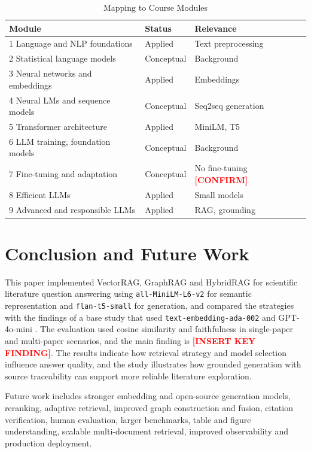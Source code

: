 \documentclass[conference]{IEEEtran}
\newcommand{\ph}[1]{\textbf{\textcolor{red}{[#1]}}}
\begin{document}
\begin{table}[t]
\caption{Mapping to Course Modules}
\label{tab:modules}
\centering
\footnotesize
\begin{tabular}{p{3.9cm}p{1.1cm}p{2.0cm}}
\toprule
Module & Status & Relevance \\
\midrule
1 Language and NLP foundations & Applied & Text preprocessing \\
2 Statistical language models & Conceptual & Background \\
3 Neural networks and embeddings & Applied & Embeddings \\
4 Neural LMs and sequence models & Conceptual & Seq2seq generation \\
5 Transformer architecture & Applied & MiniLM, T5 \\
6 LLM training, foundation models & Conceptual & Background \\
7 Fine-tuning and adaptation & Conceptual & No fine-tuning \ph{CONFIRM} \\
8 Efficient LLMs & Applied & Small models \\
9 Advanced and responsible LLMs & Applied & RAG, grounding \\
\bottomrule
\end{tabular}
\end{table}

\section{Conclusion and Future Work}
This paper implemented VectorRAG, GraphRAG and HybridRAG for scientific literature question answering using \texttt{all-MiniLM-L6-v2} for semantic representation and \texttt{flan-t5-small} for generation, and compared the strategies with the findings of a base study that used \texttt{text-embedding-ada-002} and GPT-4o-mini \cite{ghanadian2026base}. The evaluation used cosine similarity and faithfulness in single-paper and multi-paper scenarios, and the main finding is \ph{INSERT KEY FINDING}. The results indicate how retrieval strategy and model selection influence answer quality, and the study illustrates how grounded generation with source traceability can support more reliable literature exploration.

Future work includes stronger embedding and open-source generation models, reranking, adaptive retrieval, improved graph construction and fusion, citation verification, human evaluation, larger benchmarks, table and figure understanding, scalable multi-document retrieval, improved observability and production deployment.



\end{document}
